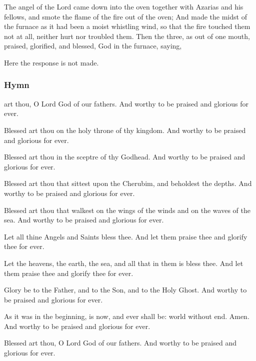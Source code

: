  The angel of the Lord came down into the oven together with Azarias and his fellows, and smote the flame of the fire out of the oven; And made the midst of the furnace as it had been a moist whistling wind, so that the fire touched them not at all, neither hurt nor troubled them. Then the three, as out of one mouth, praised, glorified, and blessed, God in the furnace, saying,
\begin{rubric}
    Here the response  is not made.
\end{rubric}
\subsubsection{Hymn}
 art thou, O Lord God of our fathers. And worthy to be praised and glorious for ever.\par
{}

Blessed art thou on the holy throne of thy kingdom. And worthy to be praised and glorious for ever.

Blessed art thou in the sceptre of thy Godhead. And worthy to be praised and glorious for ever.

Blessed art thou that sittest upon the Cherubim, and beholdest the depths. And worthy to be praised and glorious for ever.

Blessed art thou that walkest on the wings of the winds and on the waves of the sea. And worthy to be praised and glorious for ever.

Let all thine Angels and Saints bless thee. And let them praise thee and glorify thee for ever.

Let the heavens, the earth, the sea, and all that in them is bless thee. And let them praise thee and glorify thee for ever.

Glory be to the Father, and to the Son, and to the Holy Ghost. And worthy to be praised and glorious for ever.

As it was in the beginning, is now, and ever shall be: world without end. Amen. And worthy to be praised and glorious for ever.

Blessed art thou, O Lord God of our fathers. And worthy to be praised and glorious for ever.\\

